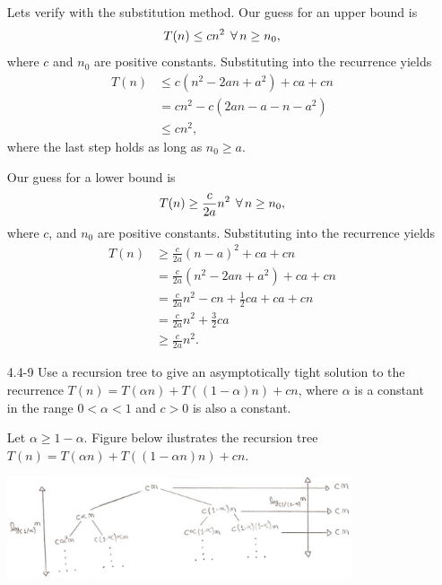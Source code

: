 \begin{enumerate}
\begin{framed}
Lets verify with the substitution method. Our guess for an upper bound is
\[
T(n) \le cn^2 \; \operatorname{\forall} n \ge n_0,
\]
where $c$ and $n_0$ are positive constants. Substituting into the
recurrence yields
\begin{equation*}
\begin{aligned}
  T(n) &\le c (n^2 - 2an + a^2) + ca + cn\\
       &=   cn^2 - c (2an - a - n - a^2)\\
       &\le cn^2,
\end{aligned}
\end{equation*}
where the last step holds as long as $n_0 \ge a$.

Our guess for a lower bound is
\[
  T(n) \ge \frac{c}{2a} n^2 \; \operatorname{\forall} n \ge n_0,
\]
where $c$, and $n_0$ are positive constants. Substituting into the
recurrence yields
\begin{equation*}
\begin{aligned}
  T(n) &\ge \frac{c}{2a} (n - a)^2 + ca + cn\\
       &=   \frac{c}{2a} (n^2 - 2an + a^2) + ca + cn\\
       &=   \frac{c}{2a} n^2 - cn + \frac{1}{2} ca + ca + cn\\
       &=   \frac{c}{2a} n^2 + \frac{3}{2} ca\\
       &\ge \frac{c}{2a} n^2.
\end{aligned}
\end{equation*}
\end{framed}

\newpage

\item[4.4{-}9]{Use a recursion tree to give an asymptotically tight solution to
the recurrence $T(n) = T(\alpha n) + T((1 - \alpha) n) + cn$, where $\alpha$ is
a constant in the range $0 < \alpha < 1$ and $c > 0$ is also a constant.}

\begin{framed}
Let $\alpha \ge 1 - \alpha$. Figure below ilustrates the recursion tree
$T(n) = T(\alpha n) + T((1 - \alpha n) n) + cn$.

\begin{center}
\includegraphics[width=0.8\textwidth]{images/4_4_9_1.pdf}
\end{center}


\end{framed}
\end{enumerate}
